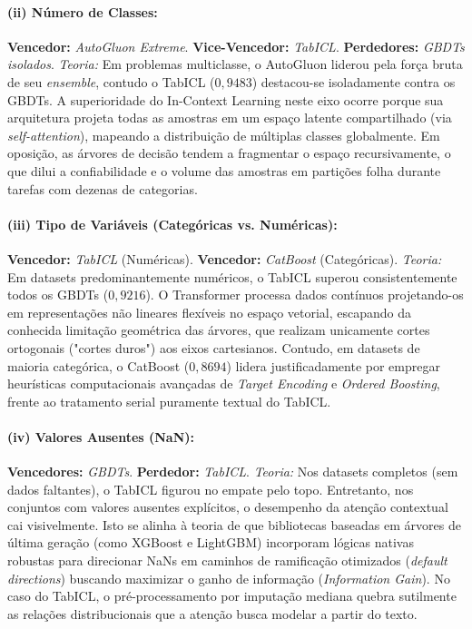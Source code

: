 \documentclass[12pt,a4paper]{article}
\begin{document}
\paragraph{(ii) Número de Classes:} 
\textbf{Vencedor:} \textit{AutoGluon Extreme}. \textbf{Vice-Vencedor:} \textit{TabICL}. \textbf{Perdedores:} \textit{GBDTs isolados}.
\textit{Teoria:} Em problemas multiclasse, o AutoGluon liderou pela força bruta de seu \textit{ensemble}, contudo o TabICL ($0{,}9483$) destacou-se isoladamente contra os GBDTs. A superioridade do In-Context Learning neste eixo ocorre porque sua arquitetura projeta todas as amostras em um espaço latente compartilhado (via \textit{self-attention}), mapeando a distribuição de múltiplas classes globalmente. Em oposição, as árvores de decisão tendem a fragmentar o espaço recursivamente, o que dilui a confiabilidade e o volume das amostras em partições folha durante tarefas com dezenas de categorias.

\paragraph{(iii) Tipo de Variáveis (Categóricas vs. Numéricas):} 
\textbf{Vencedor:} \textit{TabICL} (Numéricas). \textbf{Vencedor:} \textit{CatBoost} (Categóricas).
\textit{Teoria:} Em datasets predominantemente numéricos, o TabICL superou consistentemente todos os GBDTs ($0{,}9216$). O Transformer processa dados contínuos projetando-os em representações não lineares flexíveis no espaço vetorial, escapando da conhecida limitação geométrica das árvores, que realizam unicamente cortes ortogonais ("cortes duros") aos eixos cartesianos. Contudo, em datasets de maioria categórica, o CatBoost ($0{,}8694$) lidera justificadamente por empregar heurísticas computacionais avançadas de \textit{Target Encoding} e \textit{Ordered Boosting}, frente ao tratamento serial puramente textual do TabICL.

\paragraph{(iv) Valores Ausentes (NaN):} 
\textbf{Vencedores:} \textit{GBDTs}. \textbf{Perdedor:} \textit{TabICL}.
\textit{Teoria:} Nos datasets completos (sem dados faltantes), o TabICL figurou no empate pelo topo. Entretanto, nos conjuntos com valores ausentes explícitos, o desempenho da atenção contextual cai visivelmente. Isto se alinha à teoria de que bibliotecas baseadas em árvores de última geração (como XGBoost e LightGBM) incorporam lógicas nativas robustas para direcionar NaNs em caminhos de ramificação otimizados (\textit{default directions}) buscando maximizar o ganho de informação (\textit{Information Gain}). No caso do TabICL, o pré-processamento por imputação mediana quebra sutilmente as relações distribucionais que a atenção busca modelar a partir do texto.
\end{document}
